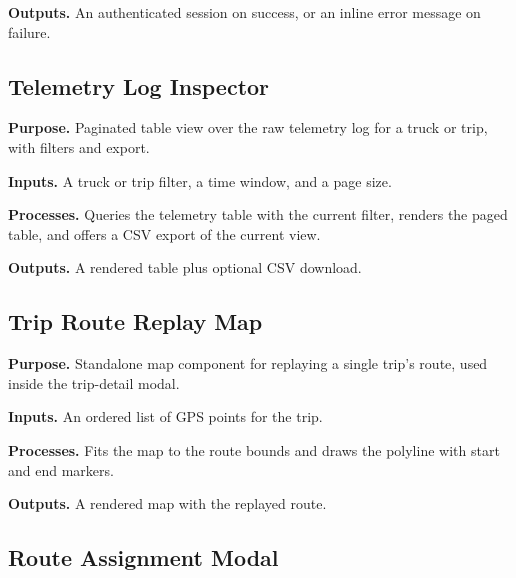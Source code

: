 \noindent\textbf{Outputs.} An authenticated session on success, or an inline error message on failure.



\subsection{Telemetry Log Inspector}
\label{sec:code_frontend_logs}

\noindent\textbf{Purpose.} Paginated table view over the raw telemetry log for a truck or trip, with filters and export.

\noindent\textbf{Inputs.} A truck or trip filter, a time window, and a page size.

\noindent\textbf{Processes.} Queries the telemetry table with the current filter, renders the paged table, and offers a CSV export of the current view.

\noindent\textbf{Outputs.} A rendered table plus optional CSV download.



\subsection{Trip Route Replay Map}
\label{sec:code_frontend_mapview}

\noindent\textbf{Purpose.} Standalone map component for replaying a single trip's route, used inside the trip-detail modal.

\noindent\textbf{Inputs.} An ordered list of GPS points for the trip.

\noindent\textbf{Processes.} Fits the map to the route bounds and draws the polyline with start and end markers.

\noindent\textbf{Outputs.} A rendered map with the replayed route.



\subsection{Route Assignment Modal}
\label{sec:code_frontend_routeassign}

